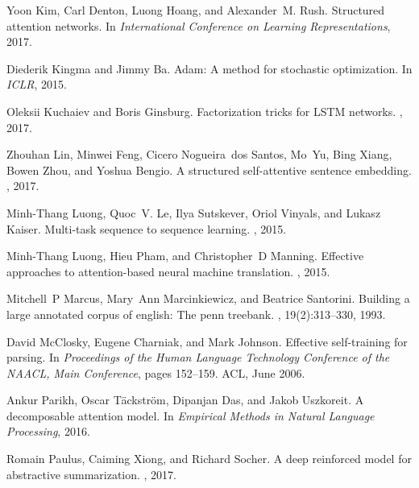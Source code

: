 \documentclass{article}
\begin{document}
\begin{thebibliography}{10}
  Yoon Kim, Carl Denton, Luong Hoang, and Alexander~M. Rush.
  \newblock Structured attention networks.
  \newblock In {\em International Conference on Learning Representations}, 2017.

  Diederik Kingma and Jimmy Ba.
  \newblock Adam: A method for stochastic optimization.
  \newblock In {\em ICLR}, 2015.

  Oleksii Kuchaiev and Boris Ginsburg.
  \newblock Factorization tricks for {LSTM} networks.
  , 2017.

  Zhouhan Lin, Minwei Feng, Cicero Nogueira~dos Santos, Mo~Yu, Bing Xiang, Bowen
  Zhou, and Yoshua Bengio.
  \newblock A structured self-attentive sentence embedding.
  , 2017.

  Minh-Thang Luong, Quoc~V. Le, Ilya Sutskever, Oriol Vinyals, and Lukasz Kaiser.
  \newblock Multi-task sequence to sequence learning.
  , 2015.

  Minh-Thang Luong, Hieu Pham, and Christopher~D Manning.
  \newblock Effective approaches to attention-based neural machine translation.
  , 2015.

  Mitchell~P Marcus, Mary~Ann Marcinkiewicz, and Beatrice Santorini.
  \newblock Building a large annotated corpus of english: The penn treebank.
  , 19(2):313--330, 1993.

  David McClosky, Eugene Charniak, and Mark Johnson.
  \newblock Effective self-training for parsing.
  \newblock In {\em Proceedings of the Human Language Technology Conference of
      the NAACL, Main Conference}, pages 152--159. ACL, June 2006.

  Ankur Parikh, Oscar Täckström, Dipanjan Das, and Jakob Uszkoreit.
  \newblock A decomposable attention model.
  \newblock In {\em Empirical Methods in Natural Language Processing}, 2016.

  Romain Paulus, Caiming Xiong, and Richard Socher.
  \newblock A deep reinforced model for abstractive summarization.
  , 2017.


\end{thebibliography}
\end{document}
